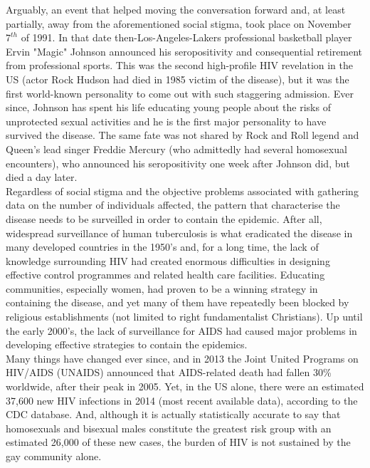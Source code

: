 Arguably, an event that helped moving the conversation forward and, at least partially, away from the aforementioned social stigma, took place on November $7^{th}$ of 1991. In that date then-Los-Angeles-Lakers professional basketball player Ervin "Magic" Johnson announced his seropositivity and consequential retirement from professional sports. This was the second high-profile HIV revelation in the US (actor Rock Hudson had died in 1985 victim of the disease), but it was the first world-known personality to come out with such staggering admission. Ever since, Johnson has spent his life educating young people about the risks of unprotected sexual activities and he is the first major personality to have survived the disease. The same fate was not shared by Rock and Roll legend and Queen's lead singer Freddie Mercury (who admittedly had several homosexual encounters), who announced his seropositivity one week after Johnson did, but died a day later.\\
Regardless of social stigma and the objective problems associated with gathering data on the number of individuals affected, the pattern that characterise the disease needs to be surveilled in order to contain the epidemic. After all, widespread surveillance of human tuberculosis is what eradicated the disease in many developed countries in the 1950's and, for a long time, the lack of knowledge surrounding HIV had created enormous difficulties in designing effective control programmes and related health care facilities. Educating communities, especially women, had proven to be a winning strategy in containing the disease, and yet many of them have repeatedly been blocked by religious establishments (not limited to right fundamentalist Christians). Up until the early 2000's, the lack of surveillance for AIDS had caused major problems in developing effective strategies to contain the epidemics.\\
Many things have changed ever since, and in 2013 the Joint United Programs on HIV/AIDS (UNAIDS) announced that AIDS-related death had fallen 30\% worldwide, after their peak in 2005. Yet, in the US alone, there were an estimated 37,600 new HIV infections in 2014 (most recent available data), according to the CDC database. And, although it is actually statistically accurate to say that homosexuals and bisexual males constitute the greatest risk group with an estimated 26,000 of these new cases, the burden of HIV is not sustained by the gay community alone.
